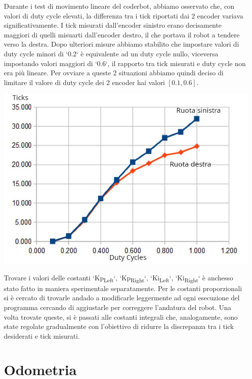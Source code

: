 \documentclass[11pt]{article}
\begin{document}
Durante i test di movimento lineare del coderbot, abbiamo osservato che, con valori di duty cycle elevati, la differenza tra i tick riportati dai 2 encoder variava significativamente. I tick misurati dall'encoder sinistro erano decisamente maggiori di quelli misuarti dall'encoder destro, il che portava il robot a tendere verso la destra.
Dopo ulteriori misure abbiamo stabilito che impostare valori di duty cycle minori di `0.2` è equivalente ad un duty cycle nullo, viceversa impostando valori maggiori di `0.6`, il rapporto tra tick misurati e duty cycle non era più lineare. Per ovviare a queste 2 situazioni abbiamo quindi deciso di limitare il valore di duty cycle dei 2 encoder hai valori \(\left[0.1,0.6\right]\).
\begin{center}
\includegraphics[width=.9\linewidth]{./img/pwm-ticks.jpg}
\end{center}

Trovare i valori delle costanti `Kp\textsubscript{Left}`, `Kp\textsubscript{Right}`, `Ki\textsubscript{Left}`, `Ki\textsubscript{Right}` è anchesso stato fatto in maniera sperimentale separatamente.
Per le costanti proporzionali si è cercato di trovarle andado a modificarle leggermente ad ogni esecuzione del programma cercando di aggiustarle per correggere l'andatura del robot. Una volta trovate queste, si è passati alle costanti integrali che, analogamente, sono state regolate gradualmente con l'obiettivo di ridurre la discrepanza tra i tick desiderati e tick misurati.
\section{Odometria}
\label{sec:org611fa9f}
\end{document}

